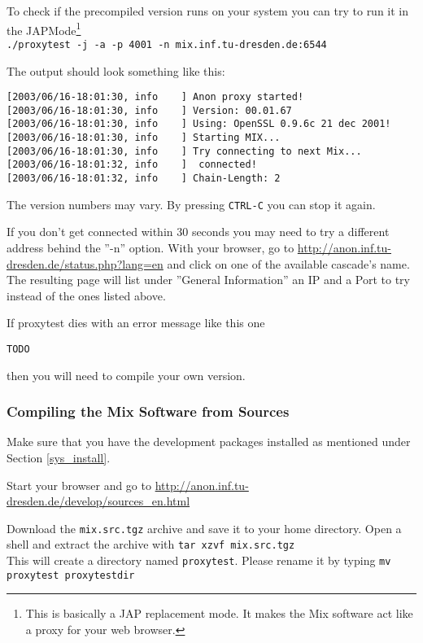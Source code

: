 \documentclass{article}
\begin{document}
To check if the precompiled version runs on your system you can try to run
it in the JAP\-Mode\footnote{This is basically a JAP replacement mode. It
makes the Mix software act like a proxy for your web browser.}\\

\verb|./proxytest -j -a -p 4001 -n mix.inf.tu-dresden.de:6544|

The output should look something like this:
\begin{verbatim}
[2003/06/16-18:01:30, info    ] Anon proxy started!
[2003/06/16-18:01:30, info    ] Version: 00.01.67
[2003/06/16-18:01:30, info    ] Using: OpenSSL 0.9.6c 21 dec 2001!
[2003/06/16-18:01:30, info    ] Starting MIX...
[2003/06/16-18:01:30, info    ] Try connecting to next Mix...
[2003/06/16-18:01:32, info    ]  connected!
[2003/06/16-18:01:32, info    ] Chain-Length: 2
\end{verbatim}

The version numbers may vary. By pressing \verb|CTRL-C| you can stop it again.

If you don't get connected within 30 seconds you may need to try a different
address behind the ''-n'' option. With your browser, go to
\url{http://anon.inf.tu-dresden.de/status.php?lang=en} and click on one of
the available cascade's name. The resulting page will list under ''General
Information'' an IP and a Port to try instead of the ones listed above.

If proxytest dies with an error message like
this one

\verb|TODO|

then you will need to compile your own version.


\subsubsection{Compiling the Mix Software from Sources}
\label{compilemix}

Make sure that you have the development packages installed as mentioned
under Section \ref{sys_install}.

Start your browser and go to
\url{http://anon.inf.tu-dresden.de/develop/sources_en.html}

Download the \verb|mix.src.tgz| archive and save it to your home directory.
Open a shell and extract the archive with \verb|tar xzvf mix.src.tgz| \\
This will create a directory named \verb|proxytest|. Please rename it by
typing \verb|mv proxytest proxytestdir| 
\end{document}
